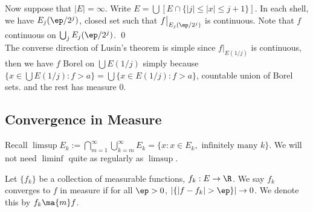 
Now suppose that $|E|=\infty$. Write $E= \bigcup \left[ E \cap \{ |j| \leq |x| \leq j+1\}\right]$. In each shell, we have $E_j(\ep/2^j)$, closed set such that $f\big|_{E_j(\ep/2^j)}$ is continuous. Note that $f$ continuous on $\bigcup_j E_j(\ep/2^j)$. \qed \\




The converse direction of Lusin's theorem is simple since $f\big|_{E(1/j)}$ is continuous, then we have $f$ Borel on $\bigcup E(1/j)$ simply because $\{x \in \bigcup E(1/j) \colon f>a \}= \bigcup \{x \in E(1/j) \colon f>a\}$, countable union of Borel sets. and the rest has measure 0. 

















\subsection{Convergence in Measure}

Recall $\limsup E_k:= \bigcap_{m=1}^\infty \bigcup_{k=m}^\infty E_k= \{ x \colon x \in E_k, \text{ infinitely many }k\}$. We will not need $\liminf$ quite as regularly as $\limsup$.



\begin{dfn}
Let $\{f_k\}$ be a collection of measurable functions, $f_k: E \to \R$. We say $f_k$ converges to $f$ in measure if for all $\ep>0$, $|\{ |f-f_k|>\ep\}| \to 0$. We denote this by $f_k \ma{m} f$. 
\end{dfn}


